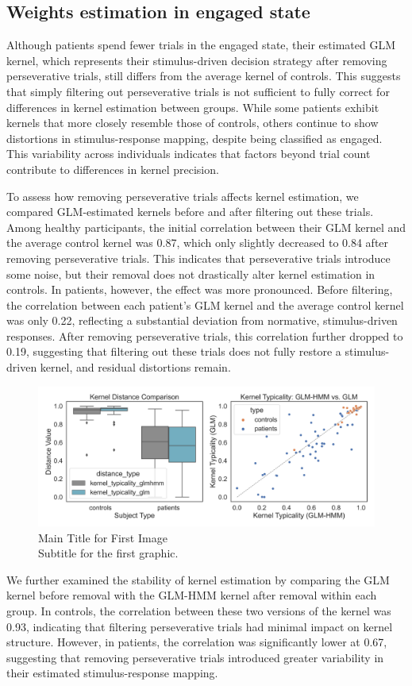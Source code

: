 \subsection{Weights estimation in engaged state}
Although patients spend fewer trials in the engaged state, their estimated GLM kernel, which represents their stimulus-driven decision strategy after removing perseverative trials, still differs from the average kernel of controls. This suggests that simply filtering out perseverative trials is not sufficient to fully correct for differences in kernel estimation between groups. While some patients exhibit kernels that more closely resemble those of controls, others continue to show distortions in stimulus-response mapping, despite being classified as engaged. This variability across individuals indicates that factors beyond trial count contribute to differences in kernel precision.  

To assess how removing perseverative trials affects kernel estimation, we compared GLM-estimated kernels before and after filtering out these trials. Among healthy participants, the initial correlation between their GLM kernel and the average control kernel was 0.87, which only slightly decreased to 0.84 after removing perseverative trials. This indicates that perseverative trials introduce some noise, but their removal does not drastically alter kernel estimation in controls. In patients, however, the effect was more pronounced. Before filtering, the correlation between each patient’s GLM kernel and the average control kernel was only 0.22, reflecting a substantial deviation from normative, stimulus-driven responses. After removing perseverative trials, this correlation further dropped to 0.19, suggesting that filtering out these trials does not fully restore a stimulus-driven kernel, and residual distortions remain.  
\begin{figure}[H]
    \centering
    \includegraphics[width=16cm]{MainLayout/Images/chapter7/distance.jpg}
    \caption{Main Title for First Image \\ \small Subtitle for the first graphic.}
    \label{fig:distance}
\end{figure}
We further examined the stability of kernel estimation by comparing the GLM kernel before removal with the GLM-HMM kernel after removal within each group. In controls, the correlation between these two versions of the kernel was 0.93, indicating that filtering perseverative trials had minimal impact on kernel structure. However, in patients, the correlation was significantly lower at 0.67, suggesting that removing perseverative trials introduced greater variability in their estimated stimulus-response mapping.  

